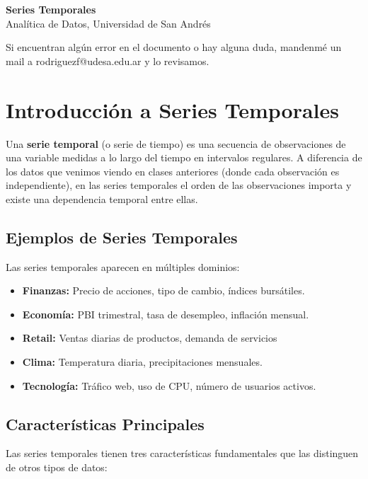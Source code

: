 \documentclass[12pt]{article}
\begin{document}
\begin{center}
  {\LARGE \textbf{Series Temporales}}\\[0.5em]
  {Analítica de Datos, Universidad de San Andrés}
\end{center}

Si encuentran algún error en el documento o hay alguna duda, mandenmé un mail a rodriguezf@udesa.edu.ar y lo revisamos.

\section{Introducción a Series Temporales}

Una \textbf{serie temporal} (o serie de tiempo) es una secuencia de observaciones de una variable medidas a lo largo del tiempo en intervalos regulares. A diferencia de los datos que venimos viendo en clases anteriores (donde cada observación es independiente), en las series temporales el orden de las observaciones importa y existe una dependencia temporal entre ellas.

\subsection{Ejemplos de Series Temporales}

Las series temporales aparecen en múltiples dominios:

\begin{itemize}
    \item \textbf{Finanzas:} Precio de acciones, tipo de cambio, índices bursátiles.
    \item \textbf{Economía:} PBI trimestral, tasa de desempleo, inflación mensual.
    \item \textbf{Retail:} Ventas diarias de productos, demanda de servicios
    \item \textbf{Clima:} Temperatura diaria, precipitaciones mensuales.
    \item \textbf{Tecnología:} Tráfico web, uso de CPU, número de usuarios activos.
\end{itemize}

\subsection{Características Principales}

Las series temporales tienen tres características fundamentales que las distinguen de otros tipos de datos:
\end{document}
